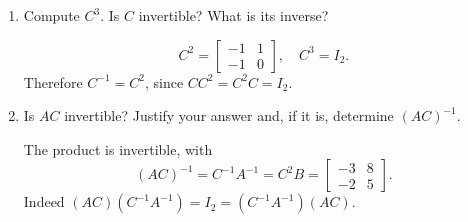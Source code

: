 \begin{enumerate}[label=\alph*)]
\item Compute $C^3$. Is $C$ invertible? What is its inverse?

\begin{answer}
\[
 C^2=\begin{bmatrix}-1&1\\-1&0\end{bmatrix},\quad C^3=I_2.
\]
Therefore $C^{-1}=C^2$, since $CC^2=C^2C=I_2$.
\end{answer}

\item Is $AC$ invertible? Justify your answer and, if it is, determine $(AC)^{-1}$.

\begin{answer}
The product is invertible, with
\[
 (AC)^{-1}=C^{-1}A^{-1}=C^2B=\begin{bmatrix}-3&8\\-2&5\end{bmatrix}.
\]
Indeed $(AC)(C^{-1}A^{-1})=I_2=(C^{-1}A^{-1})(AC)$.
\end{answer}
\end{enumerate}
